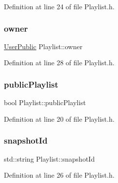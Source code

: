 Definition at line 24 of file Playlist.\+h.

\mbox{\label{class_playlist_a94aa4dbfbd684e9e92e821a06eb8ddeb}} 
\subsubsection{\texorpdfstring{owner}{owner}}
{\footnotesize\ttfamily \mbox{\hyperlink{class_user_public}{User\+Public}} Playlist\+::owner\hspace{0.3cm}{\ttfamily [private]}}



Definition at line 28 of file Playlist.\+h.

\mbox{\label{class_playlist_a88f0c7943b6b86c9017e2daa5df0964e}} 
\subsubsection{\texorpdfstring{public\+Playlist}{publicPlaylist}}
{\footnotesize\ttfamily bool Playlist\+::public\+Playlist\hspace{0.3cm}{\ttfamily [private]}}



Definition at line 20 of file Playlist.\+h.

\mbox{\label{class_playlist_ae7dea2d5e2aef27fcf6faa667358c341}} 
\subsubsection{\texorpdfstring{snapshot\+Id}{snapshotId}}
{\footnotesize\ttfamily std\+::string Playlist\+::snapshot\+Id\hspace{0.3cm}{\ttfamily [private]}}



Definition at line 26 of file Playlist.\+h.

\mbox{\label{class_playlist_a11a10489219f1916b6d8a58c36ac6605}} 
